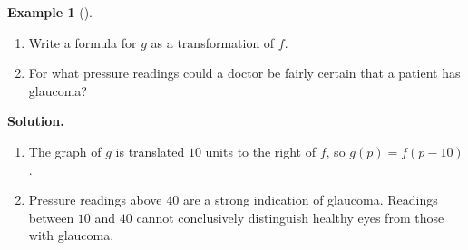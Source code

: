 \documentclass[10pt,]{book}
\theoremstyle{plain}
\theoremstyle{definition}
\theoremstyle{definition}
\newtheorem{example}[theorem]{Example}
\numberwithin{equation}{section}
\newcounter{figstack}
\newcounter{figindex}
\newlength\fight
\newcommand\pushValignCaptionBottom[5][b]{%
\stepcounter{figstack}%
\expandafter\def\csname %
figalign\romannumeral\value{figstack}\endcsname{#1}%
\expandafter\def\csname %
figtype\romannumeral\value{figstack}\endcsname{#2}%
\expandafter\def\csname %
figwd\romannumeral\value{figstack}\endcsname{#3}%
\expandafter\def\csname %
figcontent\romannumeral\value{figstack}\endcsname{#4}%
\expandafter\def\csname %
figcap\romannumeral\value{figstack}\endcsname{#5}%
\setbox0=\hbox{%
\begin{#2}{#3}#4\end{#2}}%
\ifdim\dimexpr\ht0+\dp0\relax>\fight\global\setlength{\fight}{%
\dimexpr\ht0+\dp0\relax}\fi%
}
\newcommand\popValignCaptionBottom{%
\setcounter{figindex}{0}%
\hfill%
\whiledo{\value{figindex}<\value{figstack}}{%
\stepcounter{figindex}%
\def\tmp{\csname figwd\romannumeral\value{figindex}\endcsname}%
\begin{\csname figtype\romannumeral\value{figindex}\endcsname}[t]{\tmp}%
\centering%
\stackinset{c}{}%
{\csname figalign\romannumeral\value{figindex}\endcsname}{}%
{\csname figcontent\romannumeral\value{figindex}\endcsname}%
{\rule{0pt}{\fight}}\par%
\csname figcap\romannumeral\value{figindex}\endcsname%
\end{\csname figtype\romannumeral\value{figindex}\endcsname}%
\hfill%
}%
\setcounter{figstack}{0}%
\setlength{\fight}{0pt}%
\hfill%
}
\begin{document}
\begin{example}[]\label{example-shift-bell-curve}
\leavevmode%
\leavevmode%
\begin{enumerate}[label=*\alph**]
\item\hypertarget{li-302}{}Write a formula for \(g\) as a transformation of \(f\).\item\hypertarget{li-303}{}For what pressure readings could a doctor be fairly certain that a patient has glaucoma?\end{enumerate}
\par\medskip\noindent%
\textbf{Solution.}\quad \leavevmode%
\begin{enumerate}[label=*\alph**]
\item\hypertarget{li-304}{}The graph of \(g\) is translated \(10\) units to the right of \(f\), so \(g(p) = f (p − 10)\).\item\hypertarget{li-305}{}Pressure readings above \(40\) are a strong indication of glaucoma. Readings between \(10\) and \(40\) cannot conclusively distinguish healthy eyes from those with glaucoma.\end{enumerate}
\end{example}
\end{document}
